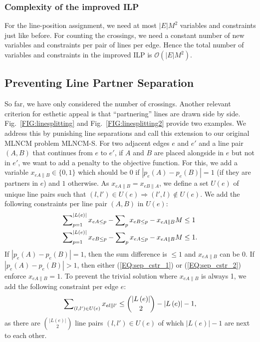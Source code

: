 \documentclass[format=acmsmall, review=false, screen=true]{acmart}
\begin{document}
\subsubsection{Complexity of the improved ILP}

For the line-position assignment, we need at most $|E|M^{2}$ variables and constraints just like before.
For counting the  crossings, we need a constant number of new variables and constraints per pair of lines per edge.
Hence the total number of variables and constraints in the improved ILP is $\mathcal{O}(|E|M^{2})$.

\subsection{Preventing Line Partner Separation}\label{SEC:separation}

So far, we have only considered the number of crossings.
Another relevant criterion for esthetic appeal is that ``partnering'' lines are drawn side by side.
Fig.~\ref{FIG:linesplitting} and Fig.~\ref{FIG:linesplitting2} provide two examples. We address this by punishing line separations and call this extension to our original MLNCM problem \mbox{MLNCM-S}. For two adjacent edges $e$ and $e'$ and a line pair $(A, B)$ that continues from $e$ to $e'$, if $A$ and $B$ are placed alongside in $e$ but not in $e'$, we want to add a penalty to the objective function. For this, we add a variable $x_{eA\|B} \in \{0, 1\}$ which should be $0$ if $\left|p_{e}(A) - p_{e}(B)\right| = 1$ (if they are partners in $e$) and $1$ otherwise. As $x_{eA\|B} = x_{eB\|A}$, we define a set $U(e)$ of unique line pairs such that $(l, l') \in U(e) \Rightarrow (l', l) \not\in U(e)$. We add the following constraints per line pair $(A, B)$ in $U(e)$:
\begin{align}
	\sum\nolimits_{p=1}^{\left|L\left(e\right)\right|} x_{eA\leq p} - \sum\nolimits_{p} x_{eB\leq p} - x_{eA\|B} M &\leq 1 \label{EQ:sep_cstr_1} \\
	\sum\nolimits_{p=1}^{\left|L\left(e\right)\right|} x_{eB\leq p} - \sum\nolimits_{p} x_{eA\leq p} - x_{eA\|B} M &\leq 1. \label{EQ:sep_cstr_2}
\end{align}
If $|p_{e}(A) - p_{e}(B)| = 1$, then the sum difference is $\leq 1$ and $x_{eA\|B}$ can be 0. If $|p_{e}(A) - p_{e}(B)| > 1$, then either (\ref{EQ:sep_cstr_1}) or (\ref{EQ:sep_cstr_2}) enforce $x_{eA\|B} = 1$. To prevent the trivial solution where $x_{eA\|B}$ is always 1, we add the following constraint per edge $e$:
\begin{align}
	\sum\nolimits_{(l, l') \in U(e)} x_{el\|l'} \leq \binom{\left|L\left(e\right)\right|}{2} - \left|L\left(e\right)\right| - 1,  \label{EQ:sep_cstr_3}
\end{align}
as there are $\binom{\left|L\left(e\right)\right|}{2}$ line pairs $(l, l') \in U(e)$ of which $\left|L\left(e\right)\right| - 1$ are next to each other.
\end{document}
